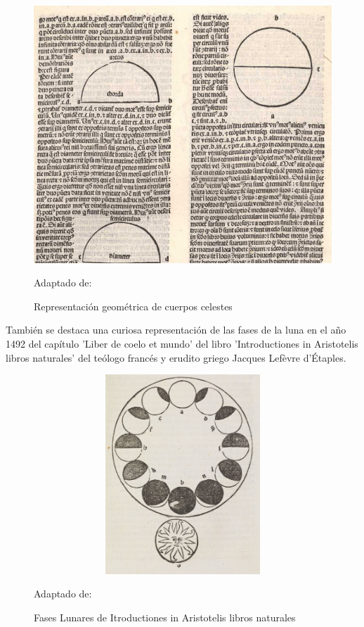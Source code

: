 \begin{figure}[H]
    \includegraphics[scale = 0.55]{Imagenes/papiro.png}
    \centering
    \caption{Representación geométrica de cuerpos celestes}{ Adaptado de: \cite{decaelo}}
\end{figure}
También se destaca una curiosa representación de las fases de la luna en el año 1492 del capítulo 'Liber de coelo et mundo' del libro 'Introductiones in Aristotelis libros naturales' del teólogo francés y erudito griego Jacques Lefèvre d'Étaples.
\begin{figure}[H]
    \includegraphics[width = 12cm, height=7.5cm]{Imagenes/fasesLunares1492.png}
    \centering
    \caption{Fases Lunares de Itroductiones in Aristotelis libros naturales}{ Adaptado de: \cite{lunarspine}}

\end{figure}
